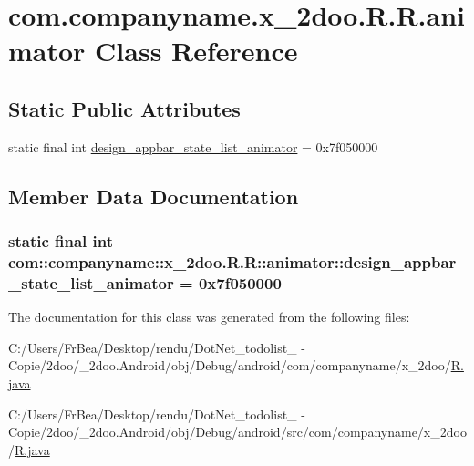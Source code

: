 \hypertarget{classcom_1_1companyname_1_1x__2doo_1_1_r_1_1animator}{
\section{com.companyname.x\_\-2doo.R.R.animator Class Reference}
\label{classcom_1_1companyname_1_1x__2doo_1_1_r_1_1animator}
}
\subsection*{Static Public Attributes}
\begin{CompactItemize}
\item 
static final int \hyperlink{classcom_1_1companyname_1_1x__2doo_1_1_r_1_1animator_f4af38944474856fff634b67c3b7f120}{design\_\-appbar\_\-state\_\-list\_\-animator} = 0x7f050000
\end{CompactItemize}


\subsection{Member Data Documentation}
\hypertarget{classcom_1_1companyname_1_1x__2doo_1_1_r_1_1animator_f4af38944474856fff634b67c3b7f120}{
\subsubsection[{design\_\-appbar\_\-state\_\-list\_\-animator}]{\setlength{\rightskip}{0pt plus 5cm}static final int com::companyname::x\_\-2doo.R.R::animator::design\_\-appbar\_\-state\_\-list\_\-animator = 0x7f050000}}
\label{classcom_1_1companyname_1_1x__2doo_1_1_r_1_1animator_f4af38944474856fff634b67c3b7f120}




The documentation for this class was generated from the following files:\begin{CompactItemize}
\item 
C:/Users/FrBea/Desktop/rendu/DotNet\_\-todolist\_ - Copie/2doo/\_\-2doo.Android/obj/Debug/android/com/companyname/x\_\-2doo/\hyperlink{com_2companyname_2x__2doo_2_r_8java}{R.java}\item 
C:/Users/FrBea/Desktop/rendu/DotNet\_\-todolist\_ - Copie/2doo/\_\-2doo.Android/obj/Debug/android/src/com/companyname/x\_\-2doo/\hyperlink{src_2com_2companyname_2x__2doo_2_r_8java}{R.java}\end{CompactItemize}
